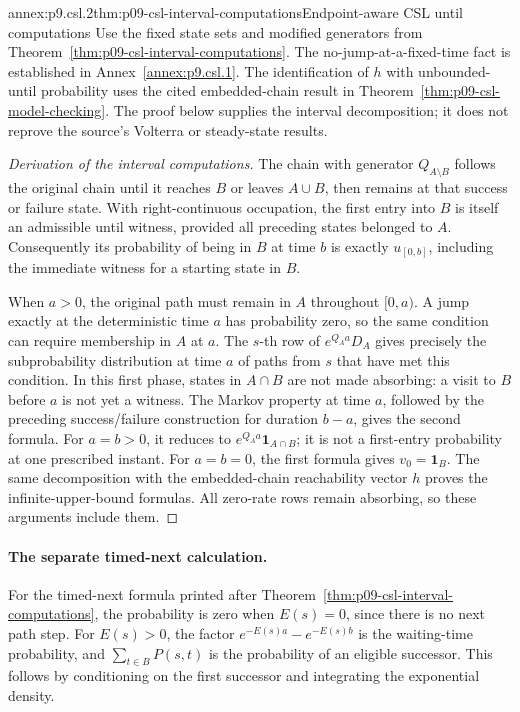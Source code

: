\begin{annexitem}{annex:p9.csl.2}{thm:p09-csl-interval-computations}{Endpoint-aware CSL until computations}
Use the fixed state sets and modified generators from
Theorem~\ref{thm:p09-csl-interval-computations}.  The no-jump-at-a-fixed-time
fact is established in Annex~\ref{annex:p9.csl.1}.
The identification of \(h\) with unbounded-until probability uses the cited
embedded-chain result in Theorem~\ref{thm:p09-csl-model-checking}.  The proof
below supplies the interval decomposition; it does not reprove the source's
Volterra or steady-state results.
\begin{proof}[Derivation of the interval computations]
The chain with generator \(Q_{A\setminus B}\) follows the original chain
until it reaches \(B\) or leaves \(A\cup B\), then remains at that success
or failure state.  With right-continuous occupation, the first entry into
\(B\) is itself an admissible until witness, provided all preceding states
belonged to \(A\).  Consequently its probability of being in \(B\) at time
\(b\) is exactly \(u_{[0,b]}\), including the immediate witness for a
starting state in \(B\).

When \(a>0\), the original path must remain in \(A\) throughout
\([0,a)\).  A jump exactly at the deterministic time \(a\) has probability
zero, so the same condition can require membership in \(A\) at \(a\).
The \(s\)-th row of \(e^{Q_Aa}D_A\) gives precisely the subprobability
distribution at time \(a\) of paths from \(s\) that have met this condition.
In this first phase, states in \(A\cap B\) are not made absorbing: a visit to
\(B\) before \(a\) is not yet a witness.  The Markov property at time
\(a\), followed by the preceding success/failure construction for duration
\(b-a\), gives the second formula.  For \(a=b>0\), it reduces to
\(e^{Q_Aa}\mathbf 1_{A\cap B}\); it is not a first-entry probability at
one prescribed instant.  For \(a=b=0\), the first formula gives
\(v_0=\mathbf 1_B\).  The same decomposition with the embedded-chain
reachability vector \(h\) proves the infinite-upper-bound formulas.
All zero-rate rows remain absorbing, so these arguments include them.
\end{proof}

\paragraph{The separate timed-next calculation.}
For the timed-next formula printed after
Theorem~\ref{thm:p09-csl-interval-computations}, the probability is zero
when \(E(s)=0\), since there is no next path step.  For \(E(s)>0\),
the factor \(e^{-E(s)a}-e^{-E(s)b}\) is the waiting-time probability,
and \(\sum_{t\in B}P(s,t)\) is the probability of an eligible successor.
This follows by
conditioning on the first successor and integrating the exponential density.
\end{annexitem}
